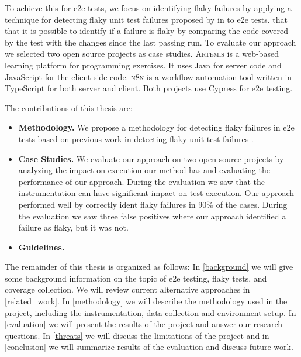 To achieve this for \ac{e2e} tests, we focus on identifying flaky failures by applying a technique for detecting flaky unit test failures proposed by \citeauthor*{bell_deflaker_2018} in  \autocite{bell_deflaker_2018} to \ac{e2e} tests.
 that that it is possible to identify if a failure is flaky by comparing the code covered by the test with the changes since the last passing run. To evaluate our approach we selected two open source projects as case studies.
\textsc{Artemis} \autocite{krusche_artemis_2018} is a web-based learning platform for programming exercises.
It uses Java for server code and JavaScript for the client-side code. 
\textsc{n8n} \autocite{noauthor_n8n_2023} is a workflow automation tool written in TypeScript for both server and client.
Both projects use Cypress \autocite{noauthor_cypress-iocypress_2023} for \ac{e2e} testing.

The contributions of this thesis are:
\begin{itemize}
	\item \textbf{Methodology.} We propose a methodology for detecting flaky failures in \ac{e2e} tests based on previous work in detecting flaky unit test failures \autocite{bell_deflaker_2018}.
	\item \textbf{Case Studies.} We evaluate our approach on two open source projects by analyzing the impact on execution our method has and evaluating the performance of our approach.
	      During the evaluation we saw that the instrumentation can have significant impact on test execution.
	      Our approach performed well by correctly ident flaky failures in 90\%  of the cases.
	      During the evaluation we saw three  false positives where our approach identified a failure as flaky, but it was not.
	\item \textbf{Guidelines.} 
\end{itemize}

The remainder of this thesis is organized as follows:
In \cref{background} we will give some background information on the topic of \ac{e2e} testing, flaky tests, and coverage collection.
We will review current alternative approaches in \cref{related_work}.
In \cref{methodology} we will describe the methodology used in the project, including the instrumentation, data collection and environment setup.
In \cref{evaluation} we will present the results of the project and answer our research questions.
In \cref{threats} we will discuss the limitations of the project and in \cref{conclusion} we will summarize results of the evaluation and discuss future work.



